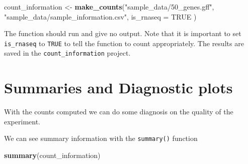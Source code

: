 \documentclass[]{book}
\newenvironment{Shaded}{\begin{snugshade}}{\end{snugshade}}
\newcommand{\DataTypeTok}[1]{\textcolor[rgb]{0.13,0.29,0.53}{#1}}
\newcommand{\KeywordTok}[1]{\textcolor[rgb]{0.13,0.29,0.53}{\textbf{#1}}}
\newcommand{\NormalTok}[1]{#1}
\newcommand{\OtherTok}[1]{\textcolor[rgb]{0.56,0.35,0.01}{#1}}
\newcommand{\StringTok}[1]{\textcolor[rgb]{0.31,0.60,0.02}{#1}}
\begin{document}
\begin{Shaded}
\begin{Highlighting}[]
\NormalTok{count_information <-}\StringTok{ }\KeywordTok{make_counts}\NormalTok{(}\StringTok{"sample_data/50_genes.gff"}\NormalTok{,}
                                 \StringTok{"sample_data/sample_information.csv"}\NormalTok{,}
                                 \DataTypeTok{is_rnaseq =} \OtherTok{TRUE}
\NormalTok{                                 )}
\end{Highlighting}
\end{Shaded}

The function should run and give no output. Note that it is important to set \texttt{is\_rnaseq} to \texttt{TRUE} to tell the function to count appropriately. The results are saved in the \texttt{count\_information} project.

\hypertarget{summaries-and-diagnostic-plots}{%
\section{Summaries and Diagnostic plots}\label{summaries-and-diagnostic-plots}}

With the counts computed we can do some diagnosis on the quality of the experiment.

We can see summary information with the \texttt{summary()} function

\begin{Shaded}
\begin{Highlighting}[]
\KeywordTok{summary}\NormalTok{(count_information)}
\end{Highlighting}
\end{Shaded}
\end{document}
